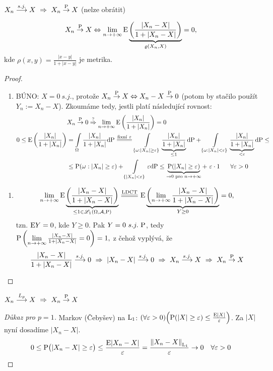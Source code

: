 \begin{theorem}
	 $X_n\stackrel{s.j.}{\longrightarrow} X~\Rightarrow~ X_n\stackrel{\mathrm{P}}{\to}X$ (nelze obrátit)
\end{theorem}
\begin{theorem}
	$$ X_n\stackrel{\mathrm{P}}{\to}X \Leftrightarrow \lim\limits_{ n\to +\infty}\mathrm{E} \underbrace{\left( \frac{|X_n-X|}{1+|X_n-X|} \right)}_{\varrho(X_n,X)}=0, $$
	kde $\rho(x,y)=\frac{|x-y|}{1+|x-y|}$ je metrika.
	\begin{proof}
		\begin{enumerate}[$\Rightarrow:$]
			\item BÚNO: $X=0~ s.j.$, protože $X_n\stackrel{\mathrm{P}}{\to}X \Leftrightarrow X_n-X\stackrel{\mathrm{P}}{\to}0$ (potom by stačilo použít $Y_n:=X_n-X$). Zkoumáme tedy, jestli platí následující rovnost:
			\[
			\begin{split}
			&X_n\stackrel{\PP}{\to}0\stackrel{?}{\Rightarrow} \lim\limits_{ n\to +\infty} \E \left( \frac{|X_n|}{1+|X_n|}\right)=0 \\
			0\leq \E \left( \frac{|X_n|}{1+|X_n|} \right)&=\int\limits_{\Omega}\frac{|X_n|}{1+|X_n|}\dif\PP\equal{\text{fixní}~\epsilon}\int\limits_{\{ \omega:|X_n|\geq\epsilon \}}\underbrace{\frac{|X_n|}{1+|X_n|}}_{\leq 1}\dif\PP+\int\limits_{\{ \omega:|X_n|<\epsilon \}}\underbrace{\frac{|X_n|}{1+|X_n|}}_{<\epsilon}\dif\PP\leq \\
			&\leq \PP(\omega:|X_n|\geq \epsilon)+\int\limits_{\{ |X_n|<\epsilon \}}\epsilon \dif\PP\leq \underbrace{\PP(|X_n|\geq \epsilon)}_{\to 0\text{ pro }n\to+\infty}+~\epsilon\cdot 1~~~~~\forall\epsilon>0\end{split}\]
		\end{enumerate}
	\begin{enumerate}[$\Leftarrow:$]
		\item 	$$\lim\limits_{ n\to +\infty} \E \underbrace{\left( \frac{|X_n-X|}{1+|X_n-X|} \right)}_{\leq 1\in\LL_1\prostor}\equal{\text{LDCT}}\E \underbrace{\left( \lim\limits_{ n\to +\infty}\frac{|X_n-X|}{1+|X_n-X|} \right)}_{Y\geq 0}=0,
		$$	tzn. $\mathrm{E} Y=0$, kde $Y\geq 0$. Pak $Y=0~s.j.~\mathrm{P}$, tedy
		$ \mathrm{P}\left( \lim\limits_{ n\to +\infty}\frac{|X_n-X|}{1+|X_n-X|}=0 \right)=1, $
		z čehož vyplývá, že $$ \frac{|X_n-X|}{1+|X_n-X|} \stackrel{s.j.}{\longrightarrow} 0~\Rightarrow~|X_n-X|\stackrel{s.j.}{\longrightarrow} 0~\Rightarrow~ X_n\stackrel{s.j.}{\longrightarrow} X~\Rightarrow~ X_n\stackrel{\mathrm{P}}{\to}X $$
	\end{enumerate}
	\end{proof}
\end{theorem}
\begin{lemma}
	$X_n\stackrel{L_p}{\longrightarrow} X~\Rightarrow~ X_n\stackrel{\mathrm{P}}{\to} X$
	\begin{proof}[Důkaz pro $p=1$]
		 Markov (Čebyšev) na $\mathrm{L}_1$: $(\forall\varepsilon>0)\Bigl(\mathrm{P}(|X|\geq \varepsilon)\leq \frac{\mathrm{E} |X|}{\varepsilon}\Bigr)$.
		Za $|X|$ nyní dosadíme $ |X_n-X| $.
		$$ 0\leq \mathrm{P}\bigl(|X_n-X|\geq \varepsilon\bigr)\leq \frac{\mathrm{E} |X_n-X|}{\varepsilon}=\frac{\left\| X_n-X\right\|_{\mathrm{L}_1}}{\varepsilon}\to 0 ~~~\forall\varepsilon>0 $$
	\end{proof}
\end{lemma}
